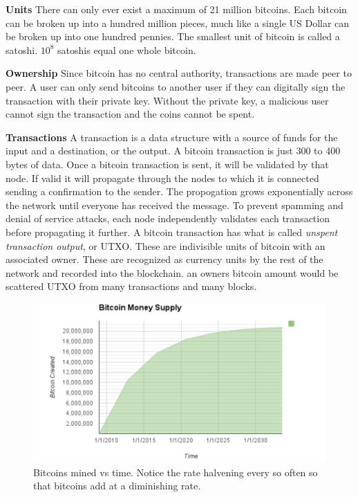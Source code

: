 \documentclass[conference]{IEEEtran}
\begin{document}
\textbf{Units} There can only ever exist a maximum of 21 million bitcoins. Each bitcoin can be broken up into a hundred million pieces, much like a single US Dollar can be broken up into one hundred pennies. The smallest unit of bitcoin is called a satoshi. $10^8$ satoshis equal one whole bitcoin. \cite{units}

\textbf{Ownership} Since bitcoin has no central authority, transactions are made peer to peer. A user can only send bitcoins to another user if they can digitally sign the transaction with their private key. Without the private key, a malicious user cannot sign the transaction and the coins cannot be spent. \cite{ownership}

\textbf{Transactions} A transaction is a data structure with a source of funds for the input and a destination, or the output. A bitcoin transaction is just 300 to 400 bytes of data. Once a bitcoin transaction is sent, it will be validated by that node. If valid it will propagate through the nodes to which it is connected sending a confirmation to the sender. The propogation grows exponentially across the network until everyone has received the message. To prevent spamming and denial of service attacks, each node independently validates each transaction before propagating it further. A bitcoin transaction has what is called \textit{unspent transaction output}, or UTXO. These are indivisible units of bitcoin with an associated owner. These are recognized as currency units by the rest of the network and recorded into the blockchain. an owners bitcoin amount would be scattered UTXO from many transactions and many blocks. \cite{trans}

\begin{figure}[ht!]
\includegraphics[scale=.3]{./IMG/bitcoin_rate.png} 
\caption{Bitcoins mined vs time. Notice the rate halvening every so often so that bitcoins add at a diminishing rate.}
\end{figure}
\end{document}
